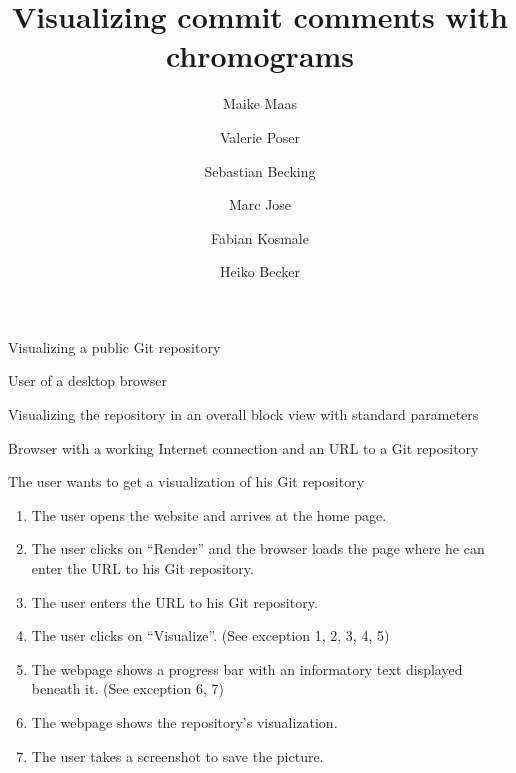 \documentclass[11pt]{scrartcl}
\author{Maike Maas \and Valerie Poser \and Sebastian Becking \and
        Marc Jose \and Fabian Kosmale \and Heiko Becker}
\title{Visualizing commit comments with chromograms}
\begin{document}
\maketitle

\begin{description}[leftmargin=!,labelwidth=\widthof{\bfseries Frequency of use:}]
	\item[Use-case:] Visualizing a public Git repository 
	\item[Primary actor:] User of a desktop browser 
	\item[Goal in context:] Visualizing the repository in an overall block view with standard parameters 
	\item[Preconditions:] Browser with a working Internet connection and an URL to a Git repository
	\item[Trigger:] The user wants to get a visualization of his Git repository 

	\item[Scenario:]
		\begin{enumerate}[leftmargin=1.5em]
			\item The user opens the website and arrives at the home page.
			\item The user clicks on \enquote{Render} and the browser loads the page where
				he can enter the URL to his Git repository. 
			\item The user enters the URL to his Git repository. 
			\item The user clicks on \enquote{Visualize}. (See exception 1, 2, 3, 4, 5)
			\item The webpage shows a progress bar with an
				informatory text displayed beneath
				it. (See exception 6, 7)
			\item The webpage shows the repository's visualization.
			\item The user takes a screenshot to save the picture. 
		\end{enumerate}


\end{description}
\end{document}
